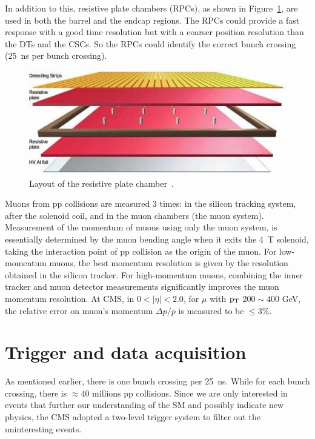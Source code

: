 In addition to this, resistive plate chambers (RPCs), as shown in Figure~\ref{fig:RPC}, are used in both the barrel and the endcap regions. The RPCs could provide a fast response with a good time resolution but with a coarser position resolution than the DTs and the CSCs.  So the RPCs could identify the correct bunch crossing (25~ns per bunch crossing). 

\begin{figure}[!htbp]
\centering
\includegraphics[width=.9\textwidth]{figures/RPC.jpg}
\caption{Layout of the resistive plate chamber~\cite{web:CSC}.}
\label{fig:RPC}
\end{figure}

Muons from pp collisions are measured 3 times: in the silicon tracking system, after the solenoid coil, and in the muon chambers (the muon system). 
Measurement of the momentum of muons using only the muon system, is essentially determined by the muon bending angle when it exits  the 4~T solenoid, taking the interaction point of pp collision as the origin of the muon.
For low-momentum muons, the best momentum resolution is given by the resolution 
obtained in the silicon tracker. For high-momentum muons, combining the inner tracker and muon detector measurements significantly improves the muon momentum resolution.  
At CMS, in $0 < |\eta| < 2.0 $, for $\mu$ with $\mathrm{p_{T}}$ $200{\sim}400$ GeV,
the relative error on muon's momentum $\Delta p / p$ is measured to be $\leq 3\%$.


\section{Trigger and data acquisition}

As mentioned earlier, there is one bunch crossing per 25~ns. While for each bunch crossing, there 
is ${\approx}40$ millions pp collisions. Since we are only interested in events that further our understanding of the SM and possibly indicate new physics,  
the CMS adopted a two-level trigger system to filter out the uninteresting events. 

